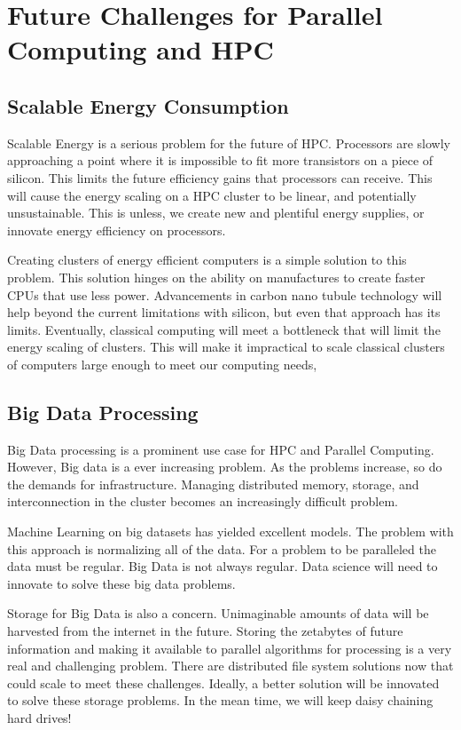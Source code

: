 \setlength{\parindent}{10ex}

\section{Future Challenges for Parallel Computing and HPC}

\subsection{Scalable Energy Consumption}
Scalable Energy is a serious problem for the future of HPC.
Processors are slowly approaching a point where it is impossible to fit more transistors on a piece of silicon.
This limits the future efficiency gains that processors can receive. 
This will cause the energy scaling on a HPC cluster to be linear, and potentially unsustainable.
This is unless, we create new and plentiful energy supplies, or innovate energy efficiency on processors.

\par
Creating clusters of energy efficient computers is a simple solution to this problem.
This solution hinges on the ability on manufactures to create faster CPUs that use less power.
Advancements in carbon nano tubule technology will help beyond the current limitations with silicon, but even that approach has its limits.
Eventually, classical computing will meet a bottleneck that will limit the energy scaling of clusters.
This will make it impractical to scale classical clusters of computers large enough to meet our computing needs,

\subsection{Big Data Processing}
Big Data processing is a prominent use case for HPC and Parallel Computing. 
However, Big data is a ever increasing problem.
As the problems increase, so do the demands for infrastructure.
Managing distributed memory, storage, and interconnection in the cluster becomes an increasingly difficult problem.

\par
Machine Learning on big datasets has yielded excellent models.
The problem with this approach is normalizing all of the data.
For a problem to be paralleled the data must be regular.
Big Data is not always regular.
Data science will need to innovate to solve these big data problems.

\par 
Storage for Big Data is also a concern.
Unimaginable amounts of data will be harvested from the internet in the future.
Storing the zetabytes of future information and making it available to parallel algorithms for processing is a very real and challenging problem.
There are distributed file system solutions now that could scale to meet these challenges.
Ideally, a better solution will be innovated to solve these storage problems.
In the mean time, we will keep daisy chaining hard drives!

